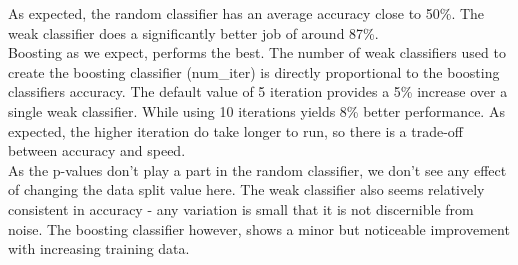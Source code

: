 
As expected, the random classifier has an average accuracy close to 50\%. The weak classifier does a significantly better job of around 87\%.\\

Boosting as we expect, performs the best. The number of weak classifiers used to create the boosting classifier (num\_iter) is directly proportional to the boosting classifiers accuracy. The default value of 5 iteration provides a 5\% increase over a single weak classifier. While using 10 iterations yields 8\% better performance. As expected, the higher iteration do take longer to run, so there is a trade-off between accuracy and speed.\\

As the p-values don't play a part in the random classifier, we don't see any effect of changing the data split value here. The weak classifier also seems relatively consistent in accuracy - any variation is small that it is not discernible from noise. The boosting classifier however, shows a minor but noticeable improvement with increasing training data.\\

